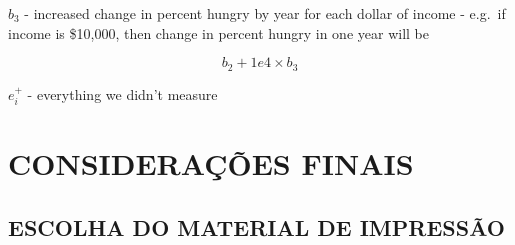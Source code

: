 \documentclass[12pt,openright,oneside,a4paper,chapter=TITLE,section=TITLE,subsection=Title,english,french,spanish,portugues,sumario=tradicional]{04-class-files/abntex2}
\begin{document}
\(b_3\) - increased change in percent hungry by year for each dollar of income - e.g.~if income is \$10,000, then change in percent hungry in one year will be

\[b_2 + 1e4 \times b_3\]

\(e^+_i\) - everything we didn't measure


\chapter*[Conclusão]{CONSIDERAÇÕES FINAIS}

\lipsum[31-33]

\postextual


\printbibliography

\postextual


{\begin{apendicesenv}

\renewcommand{\thechapter}{\arabic{chapter}}

\chapter{ESCOLHA DO MATERIAL DE IMPRESSÃO}

\lipsum[30]

\end{apendicesenv}
}{}



\printbibliography
\end{document}
